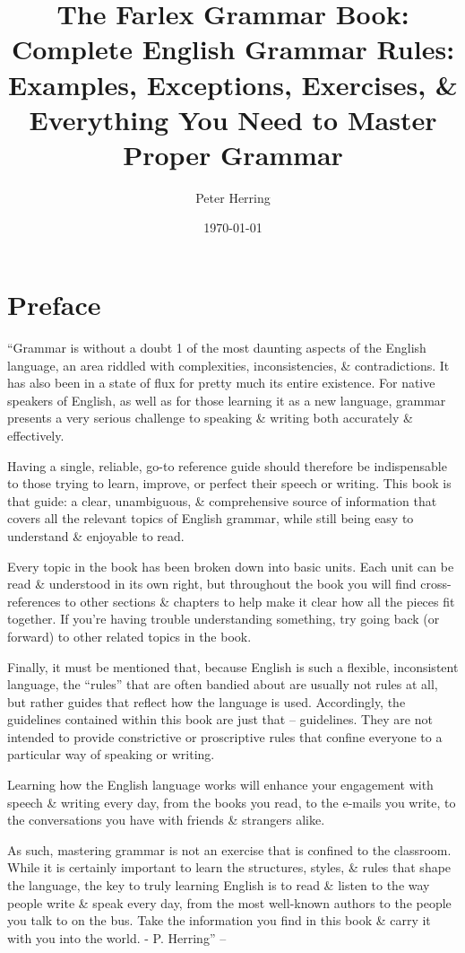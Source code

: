 \documentclass{article}
\title{The Farlex Grammar Book: Complete English Grammar Rules: Examples, Exceptions, Exercises, \& Everything You Need to Master Proper Grammar}
\author{Peter Herring}
\date{\today}
\numberwithin{equation}{section}
\begin{document}
\maketitle
\tableofcontents


\section*{Preface}
``Grammar is without a doubt 1 of the most daunting aspects of the English language, an area riddled with complexities, inconsistencies, \& contradictions. It has also been in a state of flux for pretty much its entire existence. For native speakers of English, as well as for those learning it as a new language, grammar presents a very serious challenge to speaking \& writing both accurately \& effectively.

Having a single, reliable, go-to reference guide should therefore be indispensable to those trying to learn, improve, or perfect their speech or writing. This book is that guide: a clear, unambiguous, \& comprehensive source of information that covers all the relevant topics of English grammar, while still being easy to understand \& enjoyable to read.

Every topic in the book has been broken down into basic units. Each unit can be read \& understood in its own right, but throughout the book you will find cross-references to other sections \& chapters to help make it clear how all the pieces fit together. If you're having trouble understanding something, try going back (or forward) to other related topics in the book.

Finally, it must be mentioned that, because English is such a flexible, inconsistent language, the ``rules'' that are often bandied about are usually not rules at all, but rather guides that reflect how the language is used. Accordingly, the guidelines contained within this book are just that -- guidelines. They are not intended to provide constrictive or proscriptive rules that confine everyone to a particular way of speaking or writing.

Learning how the English language works will enhance your engagement with speech \& writing every day, from the books you read, to the e-mails you write, to the conversations you have with friends \& strangers alike.

As such, mastering grammar is not an exercise that is confined to the classroom. While it is certainly important to learn the structures, styles, \& rules that shape the language, the key to truly learning English is to read \& listen to the way people write \& speak every day, from the most well-known authors to the people you talk to on the bus. Take the information you find in this book \& carry it with you into the world. - P. Herring'' -- \cite[p. 9]{Herring2016}
\end{document}
